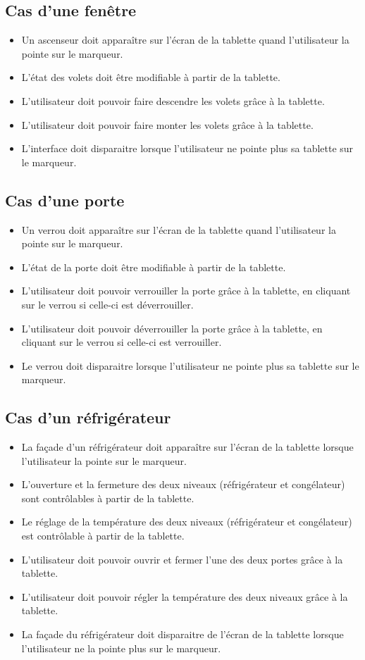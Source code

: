 \documentclass[12pt,a4paper]{article}
\begin{document}
\subsection{Cas d'une fenêtre}
\begin{itemize} 
  \item Un ascenseur doit apparaître sur l'écran de la tablette quand l'utilisateur la pointe sur le marqueur.
  \item L'état des volets doit être modifiable à partir de la tablette.
  \item L'utilisateur doit pouvoir faire descendre les volets grâce à la tablette.
  \item L'utilisateur doit pouvoir faire monter les volets grâce à la tablette.
  \item L'interface doit disparaitre lorsque l'utilisateur ne pointe plus sa tablette sur le marqueur.
\end{itemize}

\subsection{Cas d'une porte}
\begin{itemize} 
  \item Un verrou doit apparaître sur l'écran de la tablette quand l'utilisateur la pointe sur le marqueur.
  \item L'état de la porte doit être modifiable à partir de la tablette.
  \item L'utilisateur doit pouvoir verrouiller la porte grâce à la tablette, en cliquant sur le verrou si celle-ci est déverrouiller.
  \item L'utilisateur doit pouvoir déverrouiller la porte grâce à la tablette, en cliquant sur le verrou si celle-ci est verrouiller.
  \item Le verrou doit disparaitre lorsque l'utilisateur ne pointe plus sa tablette sur le marqueur.
\end{itemize}

\subsection{Cas d'un réfrigérateur}
\begin{itemize} 
 \item La façade d'un réfrigérateur doit apparaître sur l'écran de la tablette lorsque l'utilisateur la pointe sur le marqueur.
 \item L'ouverture et la fermeture des deux niveaux (réfrigérateur et congélateur) sont contrôlables à partir de la tablette.
 \item Le réglage de la température des deux niveaux (réfrigérateur et congélateur) est contrôlable à partir de la tablette.
 \item L'utilisateur doit pouvoir ouvrir et fermer l'une des deux portes grâce à la tablette.
 \item L'utilisateur doit pouvoir régler la température des deux niveaux grâce à la tablette.
 \item La façade du réfrigérateur doit disparaitre de l'écran de la tablette lorsque l'utilisateur ne la pointe plus sur le marqueur.
\end{itemize}
\end{document}
